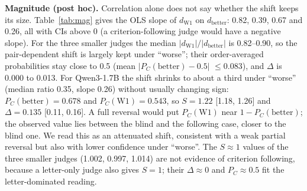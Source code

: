 \documentclass[conference]{IEEEtran}
\begin{document}
\textbf{Magnitude (post hoc).} Correlation alone does not say whether the shift keeps its size.
Table~\ref{tab:mag} gives the OLS slope of $d_\mathrm{W1}$ on $d_\mathrm{better}$: 0.82, 0.39, 0.67 and 0.26,
all with CIs above 0 (a criterion-following judge would have a negative slope). For the three smaller judges
the median $|d_\mathrm{W1}|/|d_\mathrm{better}|$ is 0.82--0.90, so the pair-dependent shift is largely kept
under ``worse''; their order-averaged probabilities stay close to 0.5 (mean $|P_C(\mathrm{better})-0.5|$
$\le0.083$), and $\Delta$ is 0.000 to 0.013. For Qwen3-1.7B the shift shrinks to about a third under ``worse''
(median ratio 0.35, slope 0.26) without usually changing sign: $P_C(\mathrm{better})=0.678$ and
$P_C(\mathrm{W1})=0.543$, so $S=1.22$ [1.18, 1.26] and $\Delta=0.135$ [0.11, 0.16]. A full reversal would put
$P_C(\mathrm{W1})$ near $1-P_C(\mathrm{better})$; the observed value lies between the blind and the
following case, closer to the blind one. We read this as an attenuated shift, consistent with a weak partial reversal but also with lower confidence under ``worse''. The $S\approx1$ values of
the three smaller judges (1.002, 0.997, 1.014) are not evidence of criterion following, because a letter-only
judge also gives $S=1$; their $\Delta\approx0$ and $P_C\approx0.5$ fit the letter-dominated reading.

\begin{table}[t]
\centering
\caption{Magnitude of the calibrated shift (post hoc, $n=300$ per judge). Slope: OLS of $d_\mathrm{W1}$ on
$d_\mathrm{better}$. Ratio: median $|d_\mathrm{W1}|/|d_\mathrm{better}|$. $P_C$: order-averaged probability
of picking $C$. $S=P_C(\mathrm{better})+P_C(\mathrm{W1})$; $\Delta=P_C(\mathrm{better})-P_C(\mathrm{W1})$.
95\% bootstrap CIs.}
\label{tab:mag}
\end{table}
\end{document}
